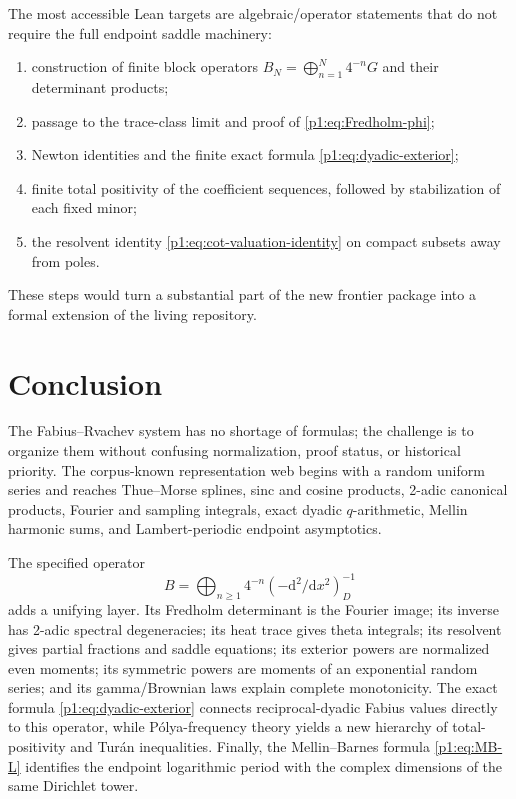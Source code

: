 \documentclass[11pt,oneside]{article}
\theoremstyle{definition}
\begin{document}
The most accessible Lean targets are algebraic/operator statements that do not require
the full endpoint saddle machinery:
\begin{enumerate}[leftmargin=2em]
\item construction of finite block operators \(B_N=\bigoplus_{n=1}^N4^{-n}G\) and
      their determinant products;
\item passage to the trace-class limit and proof of \eqref{p1:eq:Fredholm-phi};
\item Newton identities and the finite exact formula \eqref{p1:eq:dyadic-exterior};
\item finite total positivity of the coefficient sequences, followed by stabilization
      of each fixed minor;
\item the resolvent identity \eqref{p1:eq:cot-valuation-identity} on compact subsets away
      from poles.
\end{enumerate}
These steps would turn a substantial part of the new frontier package into a formal
extension of the living repository.

\section{Conclusion}
\label{p1:sec:conclusion}

The Fabius--Rvachev system has no shortage of formulas; the challenge is to organize
them without confusing normalization, proof status, or historical priority.  The
corpus-known representation web begins with a random uniform series and reaches
Thue--Morse splines, sinc and cosine products, 2-adic canonical products, Fourier and
sampling integrals, exact dyadic \(q\)-arithmetic, Mellin harmonic sums, and
Lambert-periodic endpoint asymptotics.

The specified operator
\[
 B=\bigoplus_{n\ge1}4^{-n}(-\mathrm d^2/\mathrm dx^2)_D^{-1}
\]
adds a unifying layer.  Its Fredholm determinant is the Fourier image; its inverse has
2-adic spectral degeneracies; its heat trace gives theta integrals; its resolvent gives
partial fractions and saddle equations; its exterior powers are normalized even
moments; its symmetric powers are moments of an exponential random series; and its
gamma/Brownian laws explain complete monotonicity.  The exact formula
\eqref{p1:eq:dyadic-exterior} connects reciprocal-dyadic Fabius values directly to this
operator, while P\'olya-frequency theory yields a new hierarchy of total-positivity and
Tur\'an inequalities.  Finally, the Mellin--Barnes formula \eqref{p1:eq:MB-L} identifies
the endpoint logarithmic period with the complex dimensions of the same Dirichlet
tower.
\end{document}
